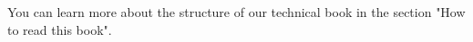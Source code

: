You can learn more about the structure of our technical book in the section "How to read this book".

\begin{figure}[H]
	\begin{minipage}[h]{0.35\linewidth}
	\end{minipage}
	\hfill
	\begin{minipage}[h]{0.35\linewidth}
	\end{minipage}
	\hfill
	\begin{minipage}[h]{0.25\linewidth}

\end{minipage}
\end{figure}
